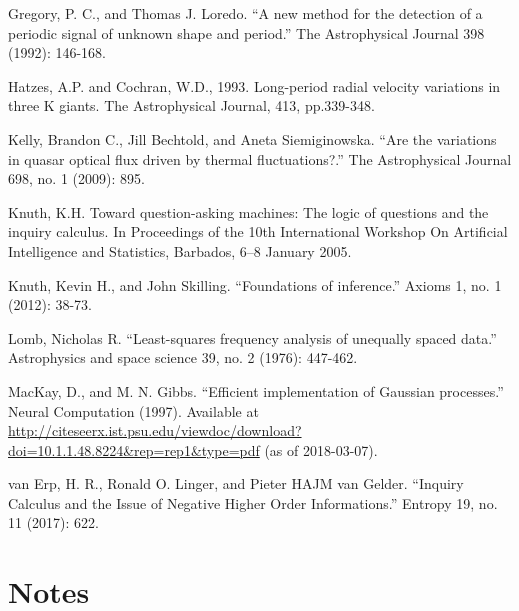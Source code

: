 \documentclass[a4paper, 12pt]{article}
\begin{document}
\begin{thebibliography}{999}
Gregory, P. C., and Thomas J. Loredo. ``A new method for the detection of a periodic signal of unknown shape and period.'' The Astrophysical Journal 398 (1992): 146-168.

Hatzes, A.P. and Cochran, W.D., 1993. Long-period radial velocity variations in three K giants. The Astrophysical Journal, 413, pp.339-348.

Kelly, Brandon C., Jill Bechtold, and Aneta Siemiginowska. ``Are the variations in quasar optical flux driven by thermal fluctuations?.'' The Astrophysical Journal 698, no. 1 (2009): 895.

Knuth, K.H. Toward question-asking machines: The logic of questions and the inquiry calculus. In
Proceedings of the 10th International Workshop On Artificial Intelligence and Statistics, Barbados, 6–8
January 2005.

Knuth, Kevin H., and John Skilling. ``Foundations of inference.''
Axioms 1, no. 1 (2012): 38-73.

Lomb, Nicholas R. ``Least-squares frequency analysis of unequally spaced data.'' Astrophysics and space science 39, no. 2 (1976): 447-462.

MacKay, D., and M. N. Gibbs. ``Efficient implementation of Gaussian processes.'' Neural Computation (1997).
Available at \url{http://citeseerx.ist.psu.edu/viewdoc/download?doi=10.1.1.48.8224&rep=rep1&type=pdf}
(as of 2018-03-07).

van Erp, H. R., Ronald O. Linger, and Pieter HAJM van Gelder. ``Inquiry Calculus and the Issue of Negative Higher Order Informations.'' Entropy 19, no. 11 (2017): 622.

\end{thebibliography}

\appendix
\section{Notes}
\end{document}
